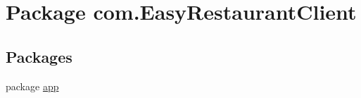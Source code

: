 \hypertarget{namespacecom_1_1_easy_restaurant_client}{}\section{Package com.\+Easy\+Restaurant\+Client}
\label{namespacecom_1_1_easy_restaurant_client}
\subsection*{Packages}
\begin{DoxyCompactItemize}
\item 
package \mbox{\hyperlink{namespacecom_1_1_easy_restaurant_client_1_1app}{app}}
\end{DoxyCompactItemize}
